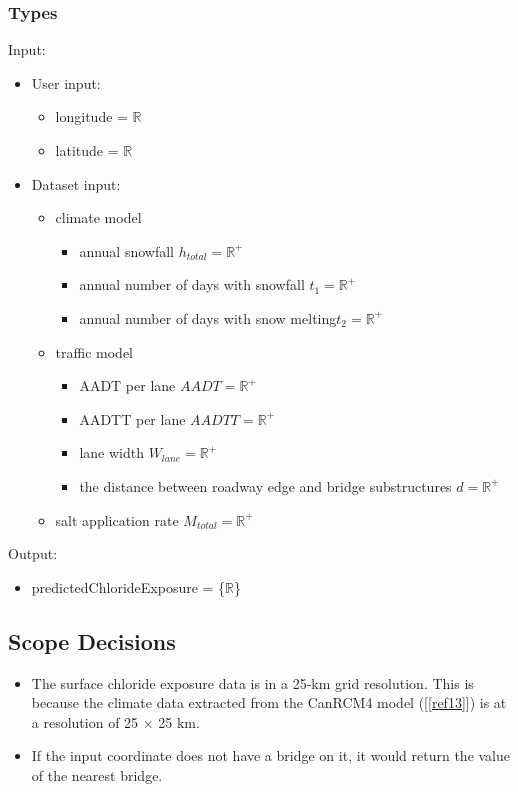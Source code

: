 \documentclass[12pt]{article}
\newcommand{\reref}[1]{\ref{#1}}
\begin{document}
\subsubsection{Types}

Input:
\begin{itemize}
\item User input: 

\begin{itemize}
\item longitude = $\mathbb{R}$
\item latitude = $\mathbb{R}$
\end{itemize}

\item Dataset input: 
\begin{itemize}
\item climate model

\begin{itemize}
\item annual snowfall $h_{total} = \mathbb R^{+}$ 
\item annual number of days with snowfall $t_1 = \mathbb R^{+}$
\item annual number of days with snow melting$t_2 = \mathbb R^{+}$
\end{itemize}

\item traffic model 
\begin{itemize}
\item AADT per lane $AADT = \mathbb R^{+}$
\item AADTT per lane $AADTT = \mathbb R^{+}$ 
\item lane width $W_{lane} = \mathbb R^{+}$
\item the distance between roadway edge and bridge substructures $d = \mathbb R^{+}$
\end{itemize}

\item salt application rate $M_{total} = \mathbb R^{+}$

\end{itemize}

\end{itemize}
Output:
\begin{itemize}
\item predictedChlorideExposure = \{$\mathbb{R}$\}
\end{itemize}


\subsection{Scope Decisions}
\begin{itemize}
\item The surface chloride exposure data is in a 25-km grid resolution. This is because the climate data extracted from the CanRCM4 model ([\reref{ref13}]) is at a resolution of 25 $\times$ 25 km.
\item If the input coordinate does not have a bridge on it, it would return the value of the nearest bridge. 
\end{itemize}
\end{document}
